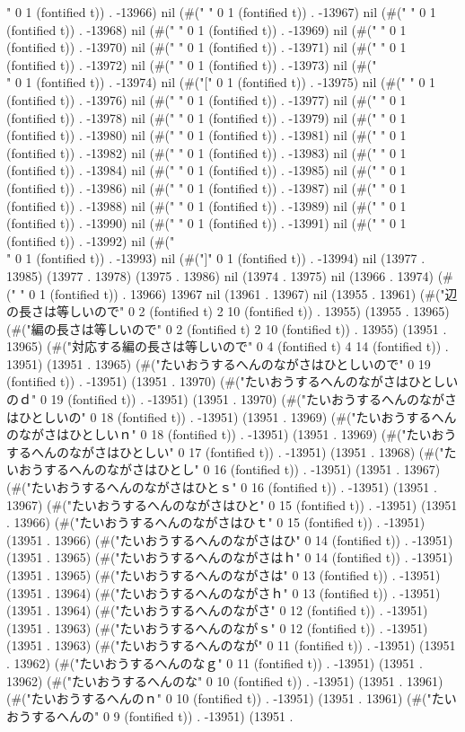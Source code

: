 " 0 1 (fontified t)) . -13966) nil (#("	" 0 1 (fontified t)) . -13967) nil (#(" " 0 1 (fontified t)) . -13968) nil (#(" " 0 1 (fontified t)) . -13969) nil (#(" " 0 1 (fontified t)) . -13970) nil (#(" " 0 1 (fontified t)) . -13971) nil (#(" " 0 1 (fontified t)) . -13972) nil (#(" " 0 1 (fontified t)) . -13973) nil (#("\\" 0 1 (fontified t)) . -13974) nil (#("[" 0 1 (fontified t)) . -13975) nil (#("
" 0 1 (fontified t)) . -13976) nil (#("	" 0 1 (fontified t)) . -13977) nil (#(" " 0 1 (fontified t)) . -13978) nil (#(" " 0 1 (fontified t)) . -13979) nil (#(" " 0 1 (fontified t)) . -13980) nil (#(" " 0 1 (fontified t)) . -13981) nil (#(" " 0 1 (fontified t)) . -13982) nil (#(" " 0 1 (fontified t)) . -13983) nil (#(" " 0 1 (fontified t)) . -13984) nil (#("
" 0 1 (fontified t)) . -13985) nil (#("	" 0 1 (fontified t)) . -13986) nil (#(" " 0 1 (fontified t)) . -13987) nil (#(" " 0 1 (fontified t)) . -13988) nil (#(" " 0 1 (fontified t)) . -13989) nil (#(" " 0 1 (fontified t)) . -13990) nil (#(" " 0 1 (fontified t)) . -13991) nil (#(" " 0 1 (fontified t)) . -13992) nil (#("\\" 0 1 (fontified t)) . -13993) nil (#("]" 0 1 (fontified t)) . -13994) nil (13977 . 13985) (13977 . 13978) (13975 . 13986) nil (13974 . 13975) nil (13966 . 13974) (#(" " 0 1 (fontified t)) . 13966) 13967 nil (13961 . 13967) nil (13955 . 13961) (#("辺の長さは等しいので" 0 2 (fontified t) 2 10 (fontified t)) . 13955) (13955 . 13965) (#("編の長さは等しいので" 0 2 (fontified t) 2 10 (fontified t)) . 13955) (13951 . 13965) (#("対応する編の長さは等しいので" 0 4 (fontified t) 4 14 (fontified t)) . 13951) (13951 . 13965) (#("たいおうするへんのながさはひとしいので" 0 19 (fontified t)) . -13951) (13951 . 13970) (#("たいおうするへんのながさはひとしいのｄ" 0 19 (fontified t)) . -13951) (13951 . 13970) (#("たいおうするへんのながさはひとしいの" 0 18 (fontified t)) . -13951) (13951 . 13969) (#("たいおうするへんのながさはひとしいｎ" 0 18 (fontified t)) . -13951) (13951 . 13969) (#("たいおうするへんのながさはひとしい" 0 17 (fontified t)) . -13951) (13951 . 13968) (#("たいおうするへんのながさはひとし" 0 16 (fontified t)) . -13951) (13951 . 13967) (#("たいおうするへんのながさはひとｓ" 0 16 (fontified t)) . -13951) (13951 . 13967) (#("たいおうするへんのながさはひと" 0 15 (fontified t)) . -13951) (13951 . 13966) (#("たいおうするへんのながさはひｔ" 0 15 (fontified t)) . -13951) (13951 . 13966) (#("たいおうするへんのながさはひ" 0 14 (fontified t)) . -13951) (13951 . 13965) (#("たいおうするへんのながさはｈ" 0 14 (fontified t)) . -13951) (13951 . 13965) (#("たいおうするへんのながさは" 0 13 (fontified t)) . -13951) (13951 . 13964) (#("たいおうするへんのながさｈ" 0 13 (fontified t)) . -13951) (13951 . 13964) (#("たいおうするへんのながさ" 0 12 (fontified t)) . -13951) (13951 . 13963) (#("たいおうするへんのながｓ" 0 12 (fontified t)) . -13951) (13951 . 13963) (#("たいおうするへんのなが" 0 11 (fontified t)) . -13951) (13951 . 13962) (#("たいおうするへんのなｇ" 0 11 (fontified t)) . -13951) (13951 . 13962) (#("たいおうするへんのな" 0 10 (fontified t)) . -13951) (13951 . 13961) (#("たいおうするへんのｎ" 0 10 (fontified t)) . -13951) (13951 . 13961) (#("たいおうするへんの" 0 9 (fontified t)) . -13951) (13951 . 